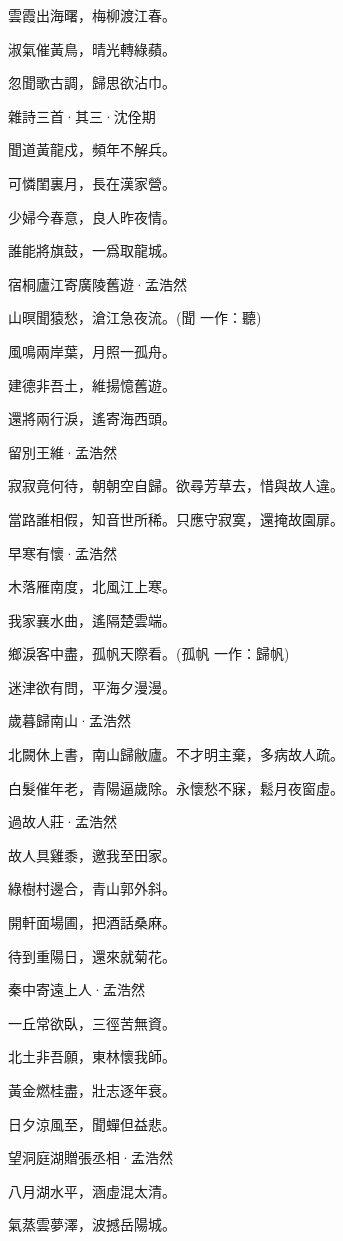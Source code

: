 \documentclass[12pt,a4paper]{ctexbook}
\begin{document}
雲霞出海曙，梅柳渡江春。\par
淑氣催黃鳥，晴光轉綠蘋。\par
忽聞歌古調，歸思欲沾巾。\par
雜詩三首·其三·沈佺期\par
聞道黃龍戍，頻年不解兵。\par
可憐閨裏月，長在漢家營。\par
少婦今春意，良人昨夜情。\par
誰能將旗鼓，一爲取龍城。\par
宿桐廬江寄廣陵舊遊·孟浩然\par
山暝聞猿愁，滄江急夜流。(聞 一作：聽)\par
風鳴兩岸葉，月照一孤舟。\par
建德非吾土，維揚憶舊遊。\par
還將兩行淚，遙寄海西頭。\par
留別王維·孟浩然\par
寂寂竟何待，朝朝空自歸。欲尋芳草去，惜與故人違。\par
當路誰相假，知音世所稀。只應守寂寞，還掩故園扉。\par
早寒有懷·孟浩然\par
木落雁南度，北風江上寒。\par
我家襄水曲，遙隔楚雲端。\par
鄉淚客中盡，孤帆天際看。(孤帆 一作：歸帆)\par
迷津欲有問，平海夕漫漫。\par
歲暮歸南山·孟浩然\par
北闕休上書，南山歸敝廬。不才明主棄，多病故人疏。\par
白髮催年老，青陽逼歲除。永懷愁不寐，鬆月夜窗虛。\par
過故人莊·孟浩然\par
故人具雞黍，邀我至田家。\par
綠樹村邊合，青山郭外斜。\par
開軒面場圃，把酒話桑麻。\par
待到重陽日，還來就菊花。\par
秦中寄遠上人·孟浩然\par
一丘常欲臥，三徑苦無資。\par
北土非吾願，東林懷我師。\par
黃金燃桂盡，壯志逐年衰。\par
日夕涼風至，聞蟬但益悲。\par
望洞庭湖贈張丞相·孟浩然\par
八月湖水平，涵虛混太清。\par
氣蒸雲夢澤，波撼岳陽城。\par
\end{document}

